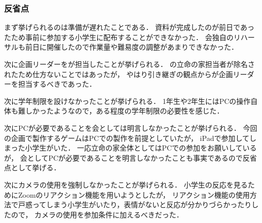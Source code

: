\subsubsection*{反省点}
まず挙げられるのは準備が遅れたことである．
資料が完成したのが前日であったため事前に参加する小学生に配布することができなかった．
会独自のリハーサルも前日に開催したので作業量や難易度の調整があまりできなかった．

次に企画リーダーを\thirdGrade{}が担当したことが挙げられる．
\secondGrade{}の立命の家担当者が除名されたため仕方ないことではあったが，
やはり引き継ぎの観点から\secondGrade{}が企画リーダーを担当するべきであった．

次に学年制限を設けなかったことが挙げられる．
1年生や2年生にはPCの操作自体も難しかったようなので，ある程度の学年制限の必要性を感じた．

次にPCが必要であることを会としては明言しなかったことが挙げられる．
今回の企画で製作するゲームはPCでの製作を前提としていたが，
iPadで参加してしまった小学生がいた．
一応立命の家全体としてはPCでの参加をお願いしているが，
会としてPCが必要であることを明言しなかったことも事実であるので反省点として挙げる．

次にカメラの使用を強制しなかったことが挙げられる．
小学生の反応を見るためにZoomのリアクション機能を用いようとしたが，
リアクション機能の使用方法で戸惑ってしまう小学生がいたり，表情がないと反応が分かりづらかったりしたので，
カメラの使用を参加条件に加えるべきだった．
